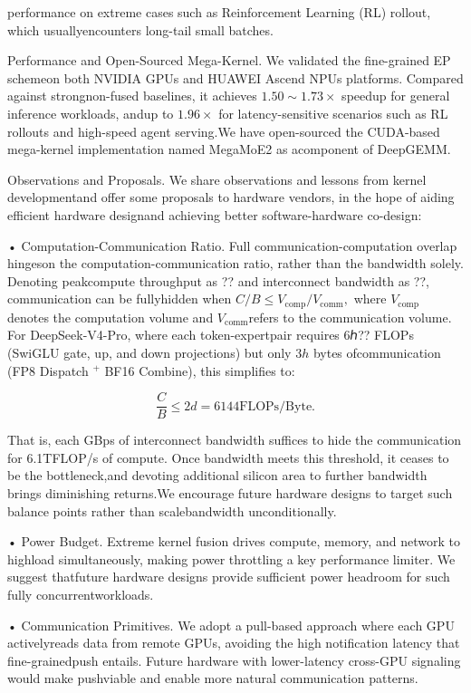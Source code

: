 \documentclass[
  10
]{article}
\begin{document}
performance on extreme cases such as Reinforcement Learning (RL)
rollout, which usuallyencounters long-tail small batches.

Performance and Open-Sourced Mega-Kernel. We validated the fine-grained
EP schemeon both NVIDIA GPUs and HUAWEI Ascend NPUs platforms. Compared
against strongnon-fused baselines, it achieves
\(1 . 5 0 \sim 1 . 7 3 \times\) speedup for general inference workloads,
andup to \(1 . 9 6 \times\) for latency-sensitive scenarios such as RL
rollouts and high-speed agent serving.We have open-sourced the
CUDA-based mega-kernel implementation named MegaMoE2 as acomponent of
DeepGEMM.

Observations and Proposals. We share observations and lessons from
kernel developmentand offer some proposals to hardware vendors, in the
hope of aiding efficient hardware designand achieving better
software-hardware co-design:

• Computation-Communication Ratio. Full communication-computation
overlap hingeson the computation-communication ratio, rather than the
bandwidth solely. Denoting peakcompute throughput as ?? and interconnect
bandwidth as ??, communication can be fullyhidden when
\(C / B \leqslant V _ { \mathrm { c o m p } } / V _ { \mathrm { c o m m } } ,\)
where \(V _ { \mathrm { c o m p } }\) denotes the computation volume and
\(V _ { \mathrm { { c o m m } } }\)refers to the communication volume.
For DeepSeek-V4-Pro, where each token-expertpair requires 6ℎ?? FLOPs
(SwiGLU gate, up, and down projections) but only \(3 h\) bytes
ofcommunication (FP8 Dispatch \(^ +\) BF16 Combine), this simplifies to:

\[
\frac {C}{B} \leqslant 2 d = 6 1 4 4 \mathrm {F L O P s / B y t e}.
\]

That is, each GBps of interconnect bandwidth suffices to hide the
communication for 6.1TFLOP/s of compute. Once bandwidth meets this
threshold, it ceases to be the bottleneck,and devoting additional
silicon area to further bandwidth brings diminishing returns.We
encourage future hardware designs to target such balance points rather
than scalebandwidth unconditionally.

• Power Budget. Extreme kernel fusion drives compute, memory, and
network to highload simultaneously, making power throttling a key
performance limiter. We suggest thatfuture hardware designs provide
sufficient power headroom for such fully concurrentworkloads.

• Communication Primitives. We adopt a pull-based approach where each
GPU activelyreads data from remote GPUs, avoiding the high notification
latency that fine-grainedpush entails. Future hardware with
lower-latency cross-GPU signaling would make pushviable and enable more
natural communication patterns.
\end{document}
